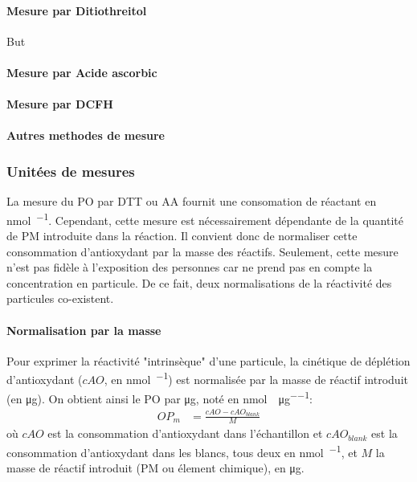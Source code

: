 \paragraph{Mesure par Ditiothreitol}%
\label{ssub:mesure_par_ditiothreitol}

\autocite{choRedox2005}

But \autocite{beiReaction2014}

\paragraph{Mesure par Acide ascorbic}%
\label{ssub:mesure_par_acide_ascorbic}

\paragraph{Mesure par DCFH}%
\label{ssub:mesure_par_dcfh}

\paragraph{Autres methodes de mesure}%
\label{sub:autres_methodes_de_mesure}

\subsubsection{Unitées de mesures}%
\label{ssub:unitees_de_mesures}

La mesure du PO par DTT ou AA fournit une consomation de réactant en \si{\nano\mole\per\min}.
Cependant, cette mesure est nécessairement dépendante de la quantité de PM introduite dans
la réaction.
Il convient donc de normaliser cette consommation d'antioxydant par la masse des réactifs.
Seulement, cette mesure n'est pas fidèle à l'exposition des personnes car ne prend pas en
compte la concentration en particule. De ce fait, deux normalisations de la réactivité des
particules co-existent.

\paragraph{Normalisation par la masse}%
\label{par:normalisation_par_la_masse}
Pour exprimer la réactivité "intrinsèque" d'une particule, la cinétique de déplétion
d'antioxydant ($cAO$, en \si{\nmol\per\min}) est normalisée par la masse de réactif
introduit (en \si{\ug}). On obtient ainsi le PO par \si{\ug}, noté \OPm{} en
\si{\nmol\per\min\per\micro\g}:
\begin{align}
    \label{eq:opm}
    OP_m &= \frac{cAO - cAO_{blank}}{M}
\end{align}
où $cAO$ est la consommation d'antioxydant dans l'échantillon et $cAO_{blank}$
est la consommation d'antioxydant dans les blancs, tous deux en \si{\nmol\per\min}, et $M$
la masse de réactif introduit (PM ou élement chimique), en \si{\ug}.

